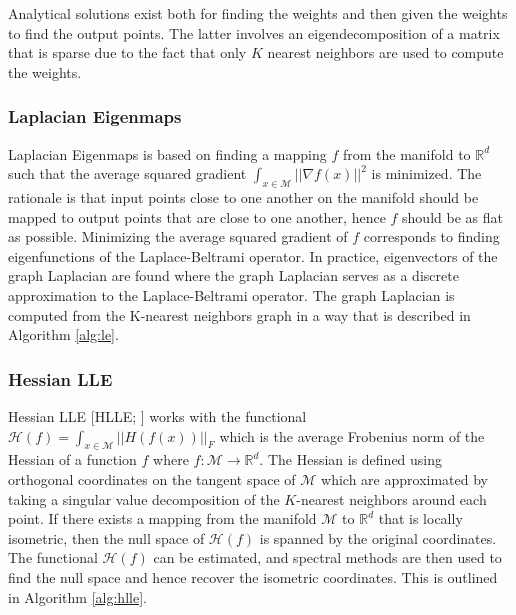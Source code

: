 \documentclass[11pt,a4paper,]{article}
\begin{document}
Analytical solutions exist both for finding the weights and then given the weights to find the output points. The latter involves an eigendecomposition of a matrix that is sparse due to the fact that only \(K\) nearest neighbors are used to compute the weights.

\hypertarget{laplacian-eigenmaps}{%
\subsubsection*{Laplacian Eigenmaps}\label{laplacian-eigenmaps}}

Laplacian Eigenmaps \autocite{Belkin2003-kz} is based on finding a mapping \(f\) from the manifold to \(\mathbb{R}^d\) such that the average squared gradient \(\int_{x\in\mathcal{M}}||\nabla f(x)||^2\) is minimized. The rationale is that input points close to one another on the manifold should be mapped to output points that are close to one another, hence \(f\) should be as flat as possible. Minimizing the average squared gradient of \(f\) corresponds to finding eigenfunctions of the Laplace-Beltrami operator. In practice, eigenvectors of the graph Laplacian are found where the graph Laplacian serves as a discrete approximation to the Laplace-Beltrami operator. The graph Laplacian is computed from the K-nearest neighbors graph in a way that is described in Algorithm \ref{alg:le}.

\hypertarget{hessian-lle}{%
\subsubsection*{Hessian LLE}\label{hessian-lle}}

Hessian LLE {[}HLLE; \textcite{Donoho2003-am}{]} works with the functional \(\mathcal{H}(f)=\int_{x\in\mathcal{M}}||H(f(x))||_F\) which is the average Frobenius norm of the Hessian of a function \(f\) where \(f:\mathcal{M}\rightarrow\mathbb{R}^d\). The Hessian is defined using orthogonal coordinates on the tangent space of \(\mathcal{M}\) which are approximated by taking a singular value decomposition of the \(K\)-nearest neighbors around each point. If there exists a mapping from the manifold \(\mathcal{M}\) to \(\mathbb{R}^d\) that is locally isometric, then the null space of \(\mathcal{H}(f)\) is spanned by the original coordinates. The functional \(\mathcal{H}(f)\) can be estimated, and spectral methods are then used to find the null space and hence recover the isometric coordinates. This is outlined in Algorithm \ref{alg:hlle}.
\end{document}
